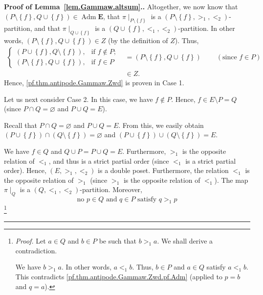 \documentclass[numbers=enddot,12pt,final,onecolumn,notitlepage,abstracton]{scrartcl}
\theoremstyle{definition}
\newenvironment{proof}[1][Proof]{\noindent\textbf{#1.} }{\ \rule{0.5em}{0.5em}}
\newcommand{\Adm}{\operatorname{Adm}}
\newcommand{\EE}{{\mathbf{E}}}
\begin{document}
\begin{proof}[Proof of Lemma~\ref{lem.Gammaw.altsum}.]
Altogether, we now know that $\left(  P\setminus\left\{  f\right\}
,Q\cup\left\{  f\right\}  \right)  \in \Adm \EE$, that
$\pi\mid_{P\setminus\left\{  f\right\}  }$ is a $\left(  P\setminus\left\{
f\right\}  ,>_{1},<_{2}\right)  $-partition, and that $\pi\mid_{Q\cup\left\{
f\right\}  }$ is a $\left(  Q\cup\left\{  f\right\}  ,<_{1},<_{2}\right)
$-partition. In other words, $\left(  P\setminus\left\{  f\right\}
,Q\cup\left\{  f\right\}  \right)  \in Z$ (by the definition of $Z$). Thus,
\begin{align*}
\begin{cases}
\left(  P\cup\left\{  f\right\}  ,Q\setminus\left\{  f\right\}  \right)  , &
\text{if }f\notin P;\\
\left(  P\setminus\left\{  f\right\}  ,Q\cup\left\{  f\right\}  \right)  , &
\text{if }f\in P
\end{cases}
& =\left(  P\setminus\left\{  f\right\}  ,Q\cup\left\{  f\right\}  \right)
\ \ \ \ \ \ \ \ \ \ \left(  \text{since }f\in P\right)  \\
& \in Z.
\end{align*}
Hence, \eqref{pf.thm.antipode.Gammaw.Zwd} is proven in Case 1.

Let us next consider Case 2. In this case, we have $f\notin P$. Hence,
$f \in E \setminus P = Q$ (since
$P \cap Q = \varnothing$ and $P \cup Q = E$).

Recall that $P\cap Q=\varnothing$ and $P\cup Q=E$. From this, we easily obtain
$\left(  P\cup\left\{  f\right\}  \right)  \cap\left(  Q\setminus\left\{
f\right\}  \right)  =\varnothing$ and $\left(  P\cup\left\{  f\right\}
\right)  \cup\left(  Q\setminus\left\{  f\right\}  \right)  =E$.

We have $f \in Q$ and
$Q \cup P = P \cup Q = E$. Furthermore, $>_1$ is the
opposite relation of $<_1$, and thus is a strict partial
order (since $<_1$ is a strict partial order). Hence,
$\left(E, >_1, <_2\right)$ is a double poset. Furthermore,
the relation $<_1$ is the opposite relation of $>_1$ (since $>_1$
is the opposite relation of $<_1$).
The map
$\pi\mid_Q$ is a $\left(Q, <_1, <_2\right)$-partition. Moreover,
\begin{equation}
\text{no } p \in Q \text{ and } q \in P \text{ satisfy }
q >_1 p
\label{pf.thm.antipode.Gammaw.Zwd.pf.AdmQP}
\end{equation}
\footnote{\textit{Proof.} Let $a \in Q$ and $b \in P$ be such that
$b >_1 a$. We shall derive a contradiction.

We have $b >_1 a$. In other words, $a <_1 b$. Thus, $b \in P$ and
$a \in Q$ satisfy $a <_1 b$. This contradicts
\eqref{pf.thm.antipode.Gammaw.Zwd.pf.Adm} (applied to $p = b$ and
$q = a$).

}
\end{proof}
\end{document}
